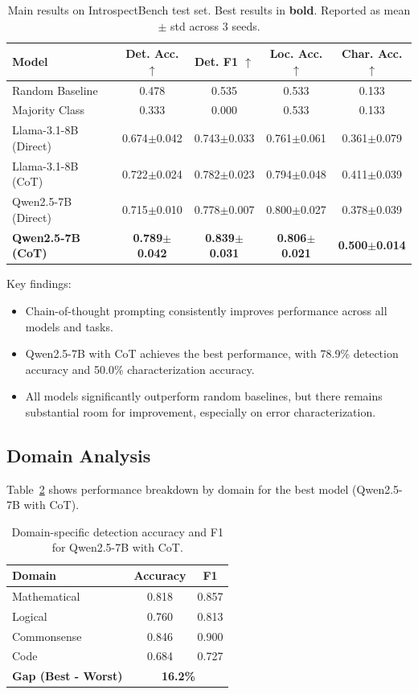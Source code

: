 \documentclass{article}
\begin{document}
\begin{table}[t]
\caption{Main results on IntrospectBench test set. Best results in \textbf{bold}. Reported as mean $\pm$ std across 3 seeds.}
\label{tab:main_results}
\centering
\begin{tabular}{lcccc}
\toprule
\textbf{Model} & \textbf{Det. Acc. $\uparrow$} & \textbf{Det. F1 $\uparrow$} & \textbf{Loc. Acc. $\uparrow$} & \textbf{Char. Acc. $\uparrow$} \\
\midrule
Random Baseline & 0.478 & 0.535 & 0.533 & 0.133 \\
Majority Class & 0.333 & 0.000 & 0.533 & 0.133 \\
\midrule
Llama-3.1-8B (Direct) & 0.674$\pm$0.042 & 0.743$\pm$0.033 & 0.761$\pm$0.061 & 0.361$\pm$0.079 \\
Llama-3.1-8B (CoT) & 0.722$\pm$0.024 & 0.782$\pm$0.023 & 0.794$\pm$0.048 & 0.411$\pm$0.039 \\
Qwen2.5-7B (Direct) & 0.715$\pm$0.010 & 0.778$\pm$0.007 & 0.800$\pm$0.027 & 0.378$\pm$0.039 \\
\textbf{Qwen2.5-7B (CoT)} & \textbf{0.789$\pm$0.042} & \textbf{0.839$\pm$0.031} & \textbf{0.806$\pm$0.021} & \textbf{0.500$\pm$0.014} \\
\bottomrule
\end{tabular}
\end{table}

Key findings:
\begin{itemize}
    \item Chain-of-thought prompting consistently improves performance across all models and tasks.
    \item Qwen2.5-7B with CoT achieves the best performance, with 78.9\% detection accuracy and 50.0\% characterization accuracy.
    \item All models significantly outperform random baselines, but there remains substantial room for improvement, especially on error characterization.
\end{itemize}

\subsection{Domain Analysis}

Table~\ref{tab:domain} shows performance breakdown by domain for the best model (Qwen2.5-7B with CoT).

\begin{table}[t]
\caption{Domain-specific detection accuracy and F1 for Qwen2.5-7B with CoT.}
\label{tab:domain}
\centering
\begin{tabular}{lcc}
\toprule
\textbf{Domain} & \textbf{Accuracy} & \textbf{F1} \\
\midrule
Mathematical & 0.818 & 0.857 \\
Logical & 0.760 & 0.813 \\
Commonsense & 0.846 & 0.900 \\
Code & 0.684 & 0.727 \\
\midrule
\textbf{Gap (Best - Worst)} & \multicolumn{2}{c}{\textbf{16.2\%}} \\
\bottomrule
\end{tabular}
\end{table}
\end{document}
